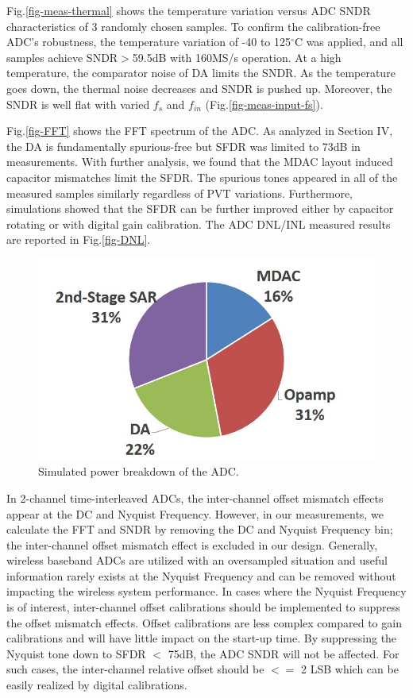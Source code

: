 Fig.\ref{fig-meas-thermal} shows the temperature variation versus ADC SNDR characteristics of 3 randomly chosen samples.  To confirm the calibration-free ADC’s robustness, the temperature variation of -40 to 125$^\circ $C was applied, and all samples achieve SNDR$>$59.5dB with 160MS/s operation.  At a high temperature, the comparator noise of DA limits the SNDR. As the temperature goes down, the thermal noise decreases and SNDR is pushed up.  Moreover, the SNDR is well flat with varied $f_s$ and $f_{in}$ (Fig.\ref{fig-meas-input-fs}).

Fig.\ref{fig-FFT} shows the FFT spectrum of the ADC. As analyzed in Section IV, the DA is fundamentally spurious-free but SFDR was limited to 73dB in measurements. With further analysis, we found that the MDAC layout induced capacitor mismatches limit the SFDR. The spurious tones appeared in all of the measured samples similarly regardless of PVT variations. Furthermore, simulations showed that the SFDR can be further improved either by capacitor rotating or with digital gain calibration. The ADC DNL/INL measured results are reported in Fig.\ref{fig-DNL}.

\begin{figure}[!]
\centering
  \includegraphics[width=1\textwidth]{figure/chap2/power-breakdown.jpg}
  \caption{Simulated power breakdown of the ADC.}
  \label{fig-power-breakdown}
\end{figure}


In 2-channel time-interleaved ADCs, the inter-channel offset mismatch effects appear at the DC and Nyquist Frequency.  However, in our measurements, we calculate the FFT and SNDR by removing the DC and Nyquist Frequency bin; the inter-channel offset mismatch effect is excluded in our design.
Generally, wireless baseband ADCs are utilized with an oversampled situation and useful information rarely exists at the Nyquist Frequency and can be removed without impacting the wireless system performance.
In cases where the Nyquist Frequency is of interest, inter-channel offset calibrations should be implemented to suppress the offset mismatch effects. Offset calibrations are less complex compared to gain calibrations and will have little impact on the start-up time. By suppressing the Nyquist tone down to SFDR $<$ 75dB, the ADC SNDR will not be affected. For such cases, the inter-channel relative offset should be $<=$ 2 LSB which can be easily realized by digital calibrations.

